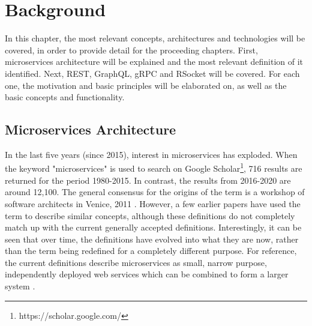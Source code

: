 
\chapter{Background} \label{sec:background}



% 

In this chapter, the most relevant concepts, architectures and technologies will be covered, in order to provide detail for the proceeding chapters. First, microservices architecture will be explained and the most relevant definition of it identified. Next, REST, GraphQL, gRPC and RSocket will be covered. For each one, the motivation and basic principles will be elaborated on, as well as the basic concepts and functionality.

\section{Microservices Architecture}
In the last five years (since 2015), interest in microservices has exploded. When the keyword "microservices" is used to search on Google Scholar\footnote{https://scholar.google.com/}, 716 results are returned for the period 1980-2015. In contrast, the results from 2016-2020 are around 12,100. The general consensus for the origins of the term is a workshop of software architects in Venice, 2011 \cite{fowler2014microservices} \cite{zimmermann2016microservices}. However, a few earlier papers have used the term to describe similar concepts, although these definitions do not completely match up with the current generally accepted definitions. Interestingly, it can be seen that over time, the definitions have evolved into what they are now, rather than the term being redefined for a completely different purpose.
For reference, the current definitions describe microservices as small, narrow purpose, independently deployed web services which can be combined to form a larger system \cite{fowler2014microservices}.

